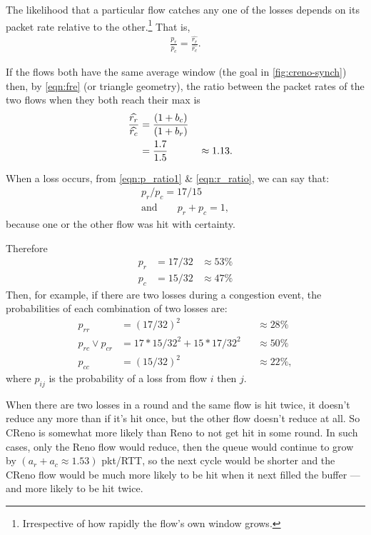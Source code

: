 The likelihood that a particular flow catches any one of the losses depends on its packet rate relative to the other.\footnote{Irrespective of how rapidly the flow's own window grows.} That is,
\begin{align}
	\frac{p_r}{p_c} = \frac{\widehat{r_r}}{\widehat{r_c}}.\label{eqn:p_ratio1}
\end{align}


If the flows both have the same average window (the goal in \autoref{fig:creno-synch})
then, by \autoref{eqn:fre} (or triangle geometry), the ratio between the packet rates of the two flows when they both reach their max is
\begin{align}
\frac{\widehat{r_r}}{\widehat{r_c}} &= \frac{(1 + b_c)}{(1 + b_r)}\notag\\
        &= \frac{1.7}{1.5} &&\approx 1.13.\label{eqn:r_ratio}
\end{align}

When a loss occurs, from \autoref{eqn:p_ratio1} \& \autoref{eqn:r_ratio}, we can say that:
\begin{align}
	p_r / p_c = 17/15\label{eqn:p_ratio}\\
\mathrm{and}\qquad p_r + p_c = 1,
\end{align}
because one or the other flow was hit with certainty.

Therefore
\begin{align*}
p_r &= 17/32 &\approx 53\%\\
p_c &= 15/32 &\approx 47\%
\end{align*}
Then, for example, if there are two losses during a congestion event, the probabilities of each combination of two losses are:
\begin{align*}
p_{rr}              &= (17/32)^2               &&\approx 28\%\\
p_{rc} \lor p_{cr}  &= 17*15/32^2 + 15*17/32^2 &&\approx 50\%\\
p_{cc}              &= (15/32)^2               &&\approx 22\%,
\end{align*}
where \(p_{ij}\) is the probability of a loss from flow \(i\) then \(j\).

When there are two losses in a round and the same flow is hit twice, it doesn't reduce any more than if it's hit once, but the other flow doesn't reduce at all. So CReno is somewhat more likely than Reno to not get hit in some round. In such cases, only the Reno flow would reduce, then the queue would continue to grow by \((a_r + a_c \approx 1.53)\) pkt/RTT, so the next cycle would be shorter and the CReno flow would be much more likely to be hit when it next filled the buffer --- and more likely to be hit twice.

